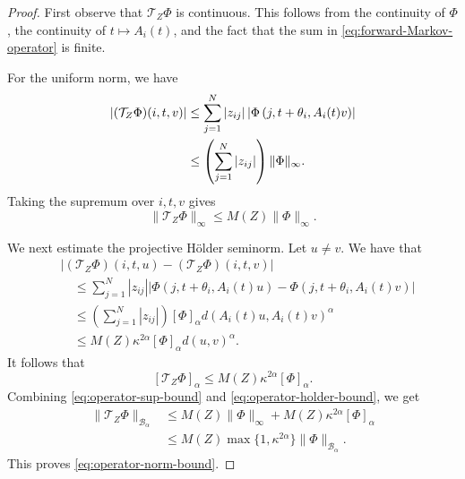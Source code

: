 \documentclass[11pt,a4paper]{amsart}
\newcommand{\R}{\mathbb R}
\begin{document}
\begin{proof}
First observe that \(\mathcal T_Z\Phi\) is continuous.  This follows
from the continuity of \(\Phi\), the continuity of \(t\mapsto A_i(t)\),
and the fact that the sum in
\eqref{eq:forward-Markov-operator} is finite.

For the uniform norm, we have
\begin{align}
 |(\mathcal T_Z\Phi)(i,t, v)|
 &\leq
 \sum_{j=1}^N|z_{ij}|
 \left|
 \Phi\left(
 j,t+\theta_i,A_i(t)v
 \right)
 \right|
 \notag\\
 &\leq
 \left(\sum_{j=1}^N|z_{ij}|\right)
 \|\Phi\|_\infty.
\end{align}
Taking the supremum over \(i,t, v\) gives
\begin{equation}\label{eq:operator-sup-bound}
 \|\mathcal T_Z\Phi\|_\infty
 \leq
 M(Z)\|\Phi\|_\infty.
\end{equation}

We next estimate the projective Hölder seminorm.%
Let \( u\neq  v\).  We have that
\begin{align*}
 &\left|
 (\mathcal T_Z\Phi)(i,t,u)
 -
 (\mathcal T_Z\Phi)(i,t, v)
 \right|
 \\
 &\quad\leq
 \sum_{j=1}^N|z_{ij}|
 \left|
 \Phi\left(
 j,t+\theta_i, A_i(t)u
 \right)
 -
 \Phi\left(
 j,t+\theta_i,A_i(t)v
 \right)
 \right|
 \\
 &\quad\leq
 \left(\sum_{j=1}^N|z_{ij}|\right)
 [\Phi]_\alpha
 d\left( A_i(t)u, A_i(t)v
 \right)^\alpha
 \\
 &\quad\leq
 M(Z)\kappa^{2\alpha}
 [\Phi]_\alpha
 d(u, v)^\alpha.
\end{align*}
It follows that
\begin{equation}\label{eq:operator-holder-bound}
 [\mathcal T_Z\Phi]_\alpha
 \leq
 M(Z)\kappa^{2\alpha}[\Phi]_\alpha.
\end{equation}
Combining \eqref{eq:operator-sup-bound} and
\eqref{eq:operator-holder-bound}, we get
\begin{align*}
 \|\mathcal T_Z\Phi\|_{\mathcal B_\alpha}
 &\leq
 M(Z)\|\Phi\|_\infty
 +
 M(Z)\kappa^{2\alpha}[\Phi]_\alpha\\
 &\leq
 M(Z)\max\{1,\kappa^{2\alpha}\}
 \|\Phi\|_{\mathcal B_\alpha}.
\end{align*}
This proves \eqref{eq:operator-norm-bound}.


\end{proof}
\end{document}
